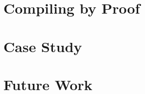 \documentclass{llncs}
\begin{document}
\section{Compiling by Proof}
\label{secCompilingByProof}


\section{Case Study}
\label{secCaseStudy}


\section{Future Work}
\label{secFutureWork}




\end{document}
